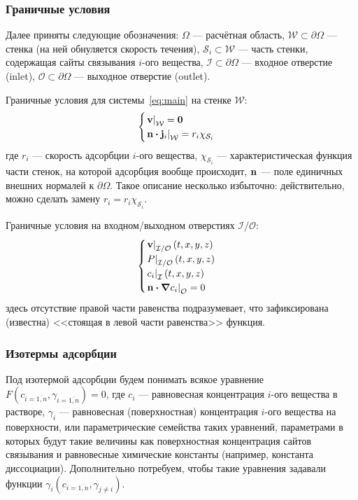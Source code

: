 \documentclass[oneside,final,12pt]{extreport}
\newcommand\bcdot[0]{\boldsymbol\cdot}
\begin{document}
\subsubsection*{Граничные условия}
Далее приняты следующие обозначения: $\Omega$ --- расчётная область,
$\mathcal{W} \subset \partial\Omega$ --- стенка
(на ней обнуляется скорость течения),
$\mathcal{S}_i \subset \mathcal{W}$ --- часть стенки,
содержащая сайты связывания $i$-ого вещества,
$\mathcal{I} \subset \partial\Omega$ --- входное отверстие (inlet),
$\mathcal{O} \subset \partial\Omega$ --- выходное отверстие (outlet).

Граничные условия для системы~\eqref{eq:main} на стенке $\mathcal{W}$:
\begin{equation}
\begin{cases}
  \left. \vb v \right|_{\mathcal{W}} = \vb 0 \\
  \left. \vb n \bcdot \vb j_i \right|_{\mathcal{W}} = r_i\chi_{\mathcal{S}_i}
\end{cases}
\label{eq:main:bc_walls}
\end{equation}
где $r_i$ --- скорость адсорбции $i$-ого вещества,
$\chi_{\mathcal{S}_i}$ --- характеристическая функция части стенок,
на которой адсорбция вообще происходит,
$\vb n$ --- поле единичных внешних нормалей к $\partial \Omega$.
Такое описание несколько избыточно: действительно, можно сделать замену
$r_i = r_i\chi_{\mathcal{S}_i}$.

Граничные условия на входном/выходном отверстиях $\mathcal{I}$/$\mathcal{O}$:
\begin{equation}
\begin{cases}
  \left. \vb v \right|_{\mathcal{I}/\mathcal{O}}\left(t, x, y, z\right) \\
  \left. P \right|_{\mathcal{I}/\mathcal{O}}\left(t, x, y, z\right) \\
  \left. c_i \right|_{\mathcal{I}}\left(t, x, y, z\right) \\
  \left. \vb n \bcdot \grad c_i \right|_{\mathcal{O}} = 0 \\
\end{cases}
\label{eq:main:bc_io}
\end{equation}
здесь отсутствие правой части равенства подразумевает, что зафиксирована
(известна) <<стоящая в левой части равенства>> функция.


\subsubsection*{Изотермы адсорбции}
Под изотермой адсорбции будем понимать всякое уравнение
$F\left(c_{i=\overline{1,n}}, \gamma_{i=\overline{1,n}}\right) = 0$, где
$c_i$ --- равновесная концентрация $i$-ого вещества в растворе,
$\gamma_i$ --- равновесная (поверхностная) концентрация $i$-ого вещества
на поверхности, или параметрические семейства таких уравнений,
параметрами в которых будут такие величины как
поверхностная концентрация сайтов связывания и
равновесные химические константы (например, константа диссоциации).
Дополнительно потребуем, чтобы такие уравнения задавали функции
$\gamma_i\left(c_{i=\overline{1,n}}, \gamma_{j\neq i}\right)$.
\end{document}
